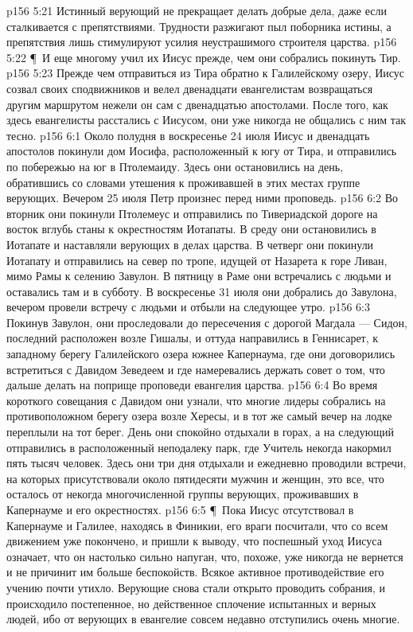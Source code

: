 \vs p156 5:21 Истинный верующий не прекращает делать добрые дела, даже если сталкивается с препятствиями. Трудности разжигают пыл поборника истины, а препятствия лишь стимулируют усилия неустрашимого строителя царства.
\vs p156 5:22 \P\ И еще многому учил их Иисус прежде, чем они собрались покинуть Тир.
\vs p156 5:23 Прежде чем отправиться из Тира обратно к Галилейскому озеру, Иисус созвал своих сподвижников и велел двенадцати евангелистам возвращаться другим маршрутом нежели он сам с двенадцатью апостолами. После того, как здесь евангелисты расстались с Иисусом, они уже никогда не общались с ним так тесно.
\vs p156 6:1 Около полудня в воскресенье 24 июля Иисус и двенадцать апостолов покинули дом Иосифа, расположенный к югу от Тира, и отправились по побережью на юг в Птолемаиду. Здесь они остановились на день, обратившись со словами утешения к проживавшей в этих местах группе верующих. Вечером 25 июля Петр произнес перед ними проповедь.
\vs p156 6:2 Во вторник они покинули Птолемеус и отправились по Тивериадской дороге на восток вглубь станы к окрестностям Иотапаты. В среду они остановились в Иотапате и наставляли верующих в делах царства. В четверг они покинули Иотапату и отправились на север по тропе, идущей от Назарета к горе Ливан, мимо Рамы к селению Завулон. В пятницу в Раме они встречались с людьми и оставались там и в субботу. В воскресенье 31 июля они добрались до Завулона, вечером провели встречу с людьми и отбыли на следующее утро.
\vs p156 6:3 Покинув Завулон, они проследовали до пересечения с дорогой Магдала --- Сидон, последний расположен возле Гишалы, и оттуда направились в Геннисарет, к западному берегу Галилейского озера южнее Капернаума, где они договорились встретиться с Давидом Зеведеем и где намеревались держать совет о том, что дальше делать на поприще проповеди евангелия царства.
\vs p156 6:4 Во время короткого совещания с Давидом они узнали, что многие лидеры собрались на противоположном берегу озера возле Хересы, и в тот же самый вечер на лодке переплыли на тот берег. День они спокойно отдыхали в горах, а на следующий отправились в расположенный неподалеку парк, где Учитель некогда накормил пять тысяч человек. Здесь они три дня отдыхали и ежедневно проводили встречи, на которых присутствовали около пятидесяти мужчин и женщин, это все, что осталось от некогда многочисленной группы верующих, проживавших в Капернауме и его окрестностях.
\vs p156 6:5 \P\ Пока Иисус отсутствовал в Капернауме и Галилее, находясь в Финикии, его враги посчитали, что со всем движением уже покончено, и пришли к выводу, что поспешный уход Иисуса означает, что он настолько сильно напуган, что, похоже, уже никогда не вернется и не причинит им больше беспокойств. Всякое активное противодействие его учению почти утихло. Верующие снова стали открыто проводить собрания, и происходило постепенное, но действенное сплочение испытанных и верных людей, ибо от верующих в евангелие совсем недавно отступились очень многие.

